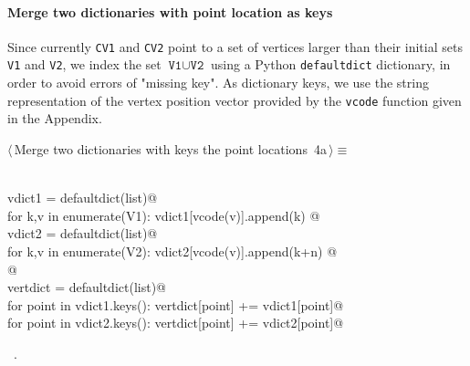 \documentclass[11pt,oneside]{article}	%
\begin{document}
\paragraph{Merge two dictionaries with point location as keys}
Since currently \texttt{CV1} and \texttt{CV2} point to a set of vertices larger than their initial sets 
\texttt{V1} and \texttt{V2}, we index the set $\texttt{V1} \cup \texttt{V2}$ using a Python \texttt{defaultdict} dictionary, in order to avoid errors of "missing key". As dictionary keys, we use the string representation of the vertex position vector provided by the \texttt{vcode} function given in the Appendix.
\begin{flushleft} \small \label{scrap5}
\protect{}$\langle\,$Merge two dictionaries with keys the point locations\nobreak\ {\footnotesize 4a}$\,\rangle\equiv$
\vspace{-1ex}
\begin{list}{}{} \item
\mbox{}\verb@@\\
\mbox{}\verb@   vdict1 = defaultdict(list)@\\
\mbox{}\verb@   for k,v in enumerate(V1): vdict1[vcode(v)].append(k) @\\
\mbox{}\verb@   vdict2 = defaultdict(list)@\\
\mbox{}\verb@   for k,v in enumerate(V2): vdict2[vcode(v)].append(k+n) @\\
\mbox{}\verb@   @\\
\mbox{}\verb@   vertdict = defaultdict(list)@\\
\mbox{}\verb@   for point in vdict1.keys(): vertdict[point] += vdict1[point]@\\
\mbox{}\verb@   for point in vdict2.keys(): vertdict[point] += vdict2[point]@\\
\mbox{}\verb@@{\NWsep}
\end{list}
\vspace{-1ex}
\footnotesize\addtolength{\baselineskip}{-1ex}
\begin{list}{}{\setlength{\itemsep}{-\parsep}\setlength{\itemindent}{-\leftmargin}}
\item \NWtxtMacroRefIn\ .
\end{list}
\end{flushleft}
\end{document}
